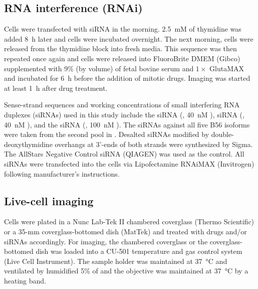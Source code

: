 \subsection{RNA interference (RNAi)}
Cells were transfected with siRNA in the morning. \SI{2.5}{mM} of thymidine was added \SI{8}{h} later and cells were incubated overnight. The next morning, cells were released from the thymidine block into fresh media. This sequence was then repeated once again and cells were released into FluoroBrite\texttrademark{} DMEM (Gibco) supplemented with 9\% (by volume) of fetal bovine serum and $1\times$ GlutaMAX and incubated for \SI{6}{h} before the addition of mitotic drugs. Imaging was started at least \SI{1}{h} after drug treatment.

Sense-strand sequences and working concentrations of small interfering RNA duplexes (siRNAs) used in this study include the  siRNA (, \SI{40}{nM} \cite{siBUBR1}),  siRNA (, \SI{40}{nM} \cite{BUB1-si5}), and the  siRNA (, \SI{100}{nM} \cite{BUBR1_XenopusVSHeLa}). The siRNAs against all five B56 isoforms were taken from the second pool in \cite{siB56s}.
Desalted siRNAs modified by double-deoxythymidine overhangs at 3'-ends of both strands were synthesized by Sigma. The AllStars Negative Control siRNA (QIAGEN) was used as the control. All siRNAs were transfected into the cells via Lipofectamine RNAiMAX (Invitrogen) following manufacturer’s instructions.

\subsection{Live-cell imaging}
\label{chpt3ImagingMethods}

Cells were plated in a Nunc Lab-Tek II chambered coverglass (Thermo Scientific) or a 35-mm coverglass-bottomed dish (MatTek) and treated with drugs and/or siRNAs accordingly. For imaging, the chambered coverglass or the coverglass-bottomed dish was loaded into a CU-501 temperature and gas control system (Live Cell Instrument). The sample holder was maintained at \SI{37}{\celsius} and ventilated by humidified 5\% of  and the objective was maintained at \SI{37}{\celsius} by a heating band.


